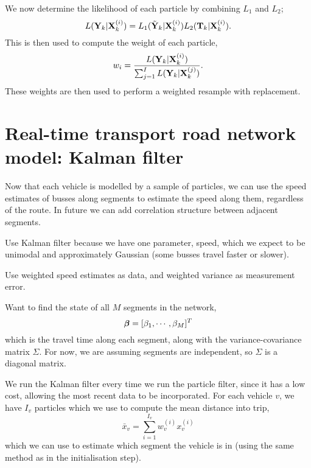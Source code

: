 \documentclass[draftcls,a4paper,onecolumn]{IEEEtran}\usepackage[]{graphicx}\usepackage[]{color}
\begin{document}
We now determine the likelihood of each particle by combining $L_1$ and $L_2$;
\begin{equation}
  \label{eq:particle_likelihood}
  L (\mathbf{Y}_k | \mathbf{X}_k^{(i)}) = L_1(\tilde{\mathbf{Y}}_k|\mathbf{X}_k^{(i)}) L_2(\mathbf{T}_k | \mathbf{X}_k^{(i)}).
\end{equation}
This is then used to compute the weight of each particle,
\begin{equation}
  \label{eq:particle_weights}
  w_i = \frac{L (\mathbf{Y}_k | \mathbf{X}_k^{(i)})}{\sum_{j=1}^I   L (\mathbf{Y}_k | \mathbf{X}_k^{(j)})}.
\end{equation}
These weights are then used to perform a weighted resample with replacement.


\section{Real-time transport road network model: Kalman filter}
\label{sec:kf}

Now that each vehicle is modelled by a sample of particles,
we can use the speed estimates of busses along segments to estimate
the speed along them, regardless of the route.
In future we can add correlation structure between adjacent segments.

Use Kalman filter because we have one parameter, speed, 
which we expect to be unimodal and approximately Gaussian
(some busses travel faster or slower).

Use weighted speed estimates as data,
and weighted variance as measurement error.

Want to find the state of all $M$ segments in the network,
\begin{equation}
  \label{eq:kf_state}
  \boldsymbol{\beta} = [\beta_1, \cdots, \beta_M]^T
\end{equation}
which is the travel time along each segment,
along with the variance-covariance matrix $\Sigma$.
For now, we are assuming segments are independent,
so $\Sigma$ is a diagonal matrix.


We run the Kalman filter every time we run the particle filter,
since it has a low cost, allowing the most recent data to be incorporated.
For each vehicle $v$, we have $I_v$ particles which we use to
compute the mean distance into trip,
\begin{equation}
  \label{eq:weighted_mean}
  \bar x_v = \sum_{i=1}^{I_v} w_v^{(i)} x_v^{(i)}
\end{equation}
which we can use to estimate which segment the vehicle is in
(using the same method as in the initialisation step).
\end{document}
